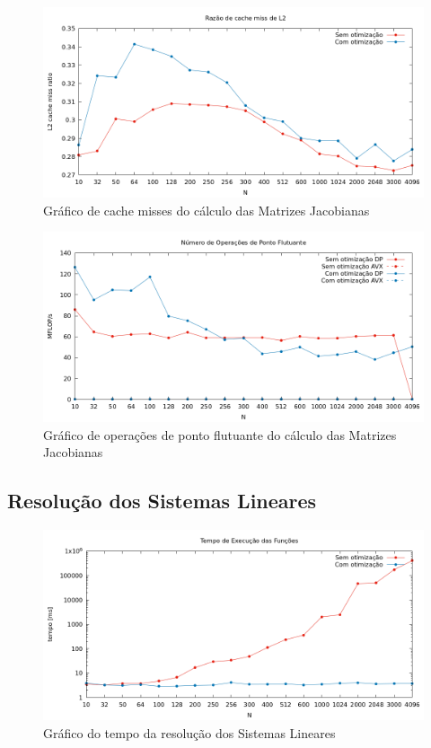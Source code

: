 \documentclass{article}
\begin{document}
\begin{figure}[htp]
    \centering
    \includegraphics[width=12cm]{l2cache_jacobiana.png}
    \caption{Gráfico de cache misses do cálculo das Matrizes Jacobianas}
    \label{fig:l2_jac}
\end{figure}

\begin{figure}[htp]
    \centering
    \includegraphics[width=12cm]{flops_dp_jacobiana.png}
    \caption{Gráfico de operações de ponto flutuante do cálculo das Matrizes Jacobianas}
    \label{fig:flops_jac}
\end{figure}

\newpage
\subsection{Resolução dos Sistemas Lineares}

\begin{figure}[htp]
    \centering
    \includegraphics[width=12cm]{tempo_sistema_linear.png}
    \caption{Gráfico do tempo da resolução dos Sistemas Lineares}
    \label{fig:tempo_sl}
\end{figure}
\end{document}
